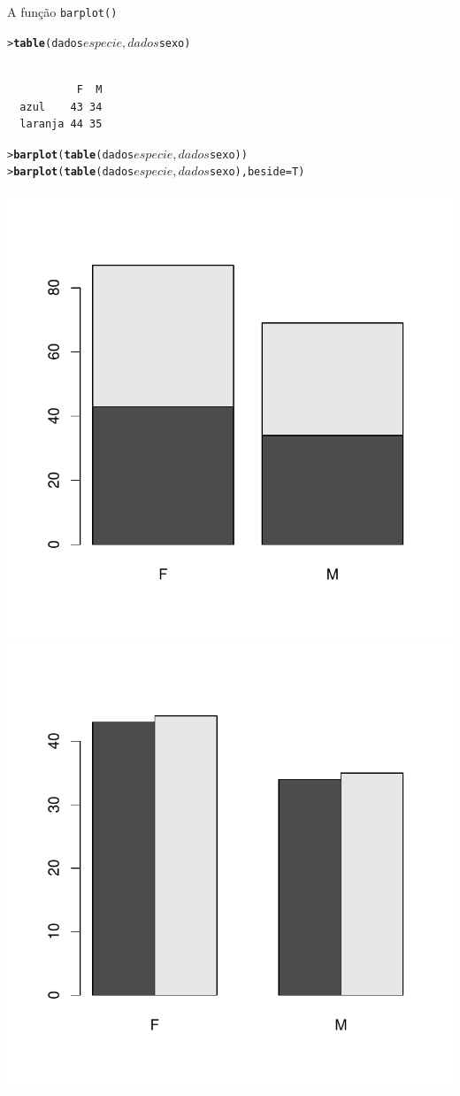 \documentclass[10pt]{beamer}\usepackage{graphicx, color}
\makeatletter
\newcommand{\hlfunctioncall}[1]{\textcolor[rgb]{0,0,0.545098039215686}{\textbf{#1}}}%
\newenvironment{kframe}{%
 \def\at@end@of@kframe{}%
 \ifinner\ifhmode%
  \def\at@end@of@kframe{\end{minipage}}%
  \begin{minipage}{\columnwidth}%
 \fi\fi%
 \def\FrameCommand##1{\hskip\@totalleftmargin \hskip-\fboxsep
 \colorbox{shadecolor}{##1}\hskip-\fboxsep
     \hskip-\linewidth \hskip-\@totalleftmargin \hskip\columnwidth}%
 \MakeFramed {\advance\hsize-\width
   \@totalleftmargin\z@ \linewidth\hsize
   \@setminipage}}%
 {\par\unskip\endMakeFramed%
 \at@end@of@kframe}
\newenvironment{knitrout}{}{} %
\makeatother
\begin{document}
\begin{frame}[fragile=singleslide]{A função \texttt{barplot()}}
\begin{knitrout}\small
{}\color{fgcolor}\begin{kframe}
\begin{alltt}
> \hlfunctioncall{table}(dados$especie, dados$sexo)
\end{alltt}
\begin{verbatim}
         
           F  M
  azul    43 34
  laranja 44 35
\end{verbatim}
\begin{alltt}
> \hlfunctioncall{barplot}(\hlfunctioncall{table}(dados$especie, dados$sexo))
> \hlfunctioncall{barplot}(\hlfunctioncall{table}(dados$especie, dados$sexo), beside = T)
\end{alltt}
\end{kframe}

{\centering \includegraphics[width=.4\textwidth]{figure/unnamed-chunk-361} \includegraphics[width=.4\textwidth]{figure/unnamed-chunk-362} 

}


\end{knitrout}

\end{frame}

\end{document}
